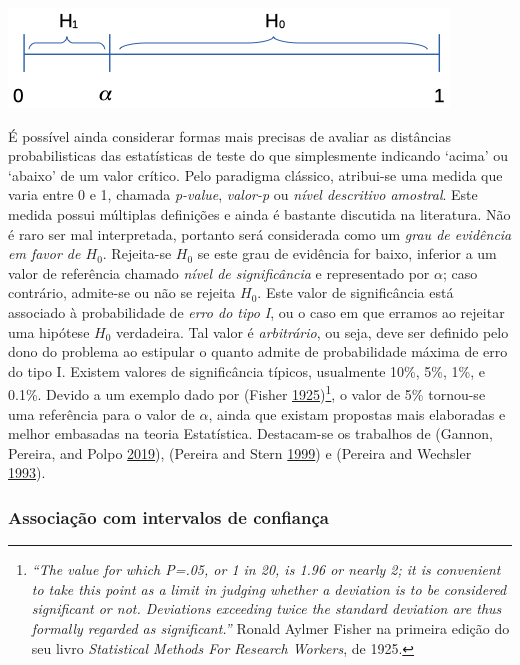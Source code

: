 \documentclass[
]{book}
\theoremstyle{definition}
\theoremstyle{definition}
\theoremstyle{definition}
\theoremstyle{remark}
\begin{document}
\includegraphics{img/decisao.png}

É possível ainda considerar formas mais precisas de avaliar as distâncias probabilisticas das estatísticas de teste do que simplesmente indicando `acima' ou `abaixo' de um valor crítico. Pelo paradigma clássico, atribui-se uma medida que varia entre 0 e 1, chamada \emph{p-value}, \emph{valor-p} ou \emph{nível descritivo amostral}. Este medida possui múltiplas definições e ainda é bastante discutida na literatura. Não é raro ser mal interpretada, portanto será considerada como um \emph{grau de evidência em favor de \(H_0\)}. Rejeita-se \(H_0\) se este grau de evidência for baixo, inferior a um valor de referência chamado \emph{nível de significância} e representado por \(\alpha\); caso contrário, admite-se ou não se rejeita \(H_0\). Este valor de significância está associado à probabilidade de \emph{erro do tipo I}, ou o caso em que erramos ao rejeitar uma hipótese \(H_0\) verdadeira. Tal valor é \emph{arbitrário}, ou seja, deve ser definido pelo dono do problema ao estipular o quanto admite de probabilidade máxima de erro do tipo I. Existem valores de significância típicos, usualmente 10\%, 5\%, 1\%, e 0.1\%. Devido a um exemplo dado por (Fisher \protect\hyperlink{ref-fisher1925statistical}{1925})\footnote{\emph{``The value for which P=.05, or 1 in 20, is 1.96 or nearly 2; it is convenient to take this point as a limit in judging whether a deviation is to be considered significant or not. Deviations exceeding twice the standard deviation are thus formally regarded as significant.''} Ronald Aylmer Fisher na primeira edição do seu livro \emph{Statistical Methods For Research Workers}, de 1925.}, o valor de 5\% tornou-se uma referência para o valor de \(\alpha\), ainda que existam propostas mais elaboradas e melhor embasadas na teoria Estatística. Destacam-se os trabalhos de (Gannon, Pereira, and Polpo \protect\hyperlink{ref-gannon2019blending}{2019}), (Pereira and Stern \protect\hyperlink{ref-pereira1999evidence}{1999}) e (Pereira and Wechsler \protect\hyperlink{ref-pereira1993concept}{1993}).

\hypertarget{associauxe7uxe3o-com-intervalos-de-confianuxe7a}{%
\subsubsection*{Associação com intervalos de confiança}\label{associauxe7uxe3o-com-intervalos-de-confianuxe7a}}
\end{document}
